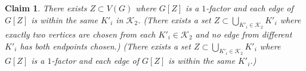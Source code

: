 \documentclass[12pt]{article}
\newtheorem{claim}[theorem]{Claim}
\theoremstyle{definition}
\begin{document}
%

\begin{claim}
There exists $Z\subset V(G)$ where $G[Z]$ is a $1$-factor and each edge of $G[Z]$ is within the same $K'_i$ in $\mathcal{K}_2$. 
(There exists a set $Z\subset \bigcup_{K'_i\in \mathcal{K}_2}K'_i$ where exactly two vertices are chosen from each $K'_i\in \mathcal{K}_2$ and no edge from different $K'_i$ has both endpoints chosen.)
(There exists a set $Z\subset \bigcup_{K'_i\in \mathcal{K}_2}K'_i$ where $G[Z]$ is a $1$-factor and each edge of $G[Z]$ is within the same $K'_i$.)
\end{claim}
\end{document}
